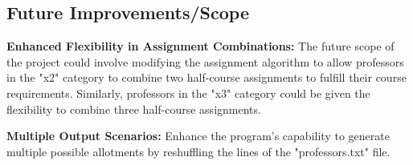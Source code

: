 \documentclass{article}
\begin{document}
\subsection*{Future Improvements/Scope}
\textbf{Enhanced Flexibility in Assignment Combinations:} The future scope of the project could involve modifying the assignment algorithm to allow professors in the "x2" category to combine two half-course assignments to fulfill their course requirements. Similarly, professors in the "x3" category could be given the flexibility to combine three half-course assignments.

\textbf{Multiple Output Scenarios:} Enhance the program's capability to generate multiple possible allotments by reshuffling the lines of the "professors.txt" file.
\end{document}

